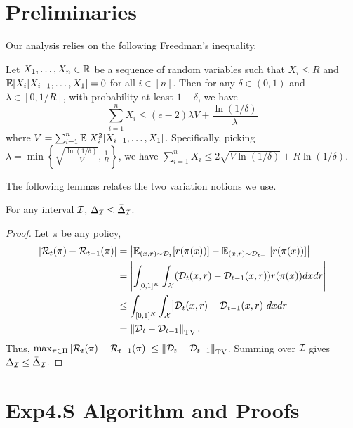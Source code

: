 \section{Preliminaries}\label{app:Freedman}

Our analysis relies on the following Freedman's inequality.
\begin{lemma}
\label{lem:freedman}
Let $X_1, \ldots, X_n \in \mathbb{R}$ be a sequence of random variables such that 
$X_i \leq R$ and $\mathbb{E}[X_i | X_{i-1}, \ldots, X_1] = 0$ for all $i \in [n]$.
Then for any $\delta \in (0,1)$ and $\lambda \in [0, 1/R]$, with probability at least $1-\delta$, we have
\[
\sum_{i=1}^n X_i \leq (e-2)\lambda V + \frac{\ln(1/\delta)}{\lambda}
\]
where $V = \sum_{i=1}^n \mathbb{E}[X_i^2 | X_{i-1}, \ldots, X_1]$.
Specifically, picking $\lambda = \min\left\{\sqrt{\frac{\ln(1/\delta)}{V}}, \frac{1}{R}\right\}$,
we have $\sum_{i=1}^n X_i  \leq 2\sqrt{V\ln(1/\delta)} + R\ln(1/\delta)$.
\end{lemma}


The following lemmas relates the two variation notions we use.
\begin{lemma}
\label{lemma:variation_relation}
  For any interval ${\mathcal{I}}$, $\Delta_{\mathcal{I}} \leq \bar{\Delta}_{\mathcal{I}}$. 
\end{lemma}

\begin{proof}
  Let $\pi$ be any policy, 
  \begin{align*} 
    |\calR_t(\pi) - \calR_{t-1}(\pi)| 
    & = \bigabs{ \E_{(x,r)\sim \calD_t}[r(\pi(x))] - \E_{(x,r)\sim \calD_{t-1}}[r(\pi(x))] }\\
    & = \left| \int_{[0,1]^K}\int_{\calX} (\calD_{t}(x,r)-\calD_{t-1}(x,r)) r(\pi(x))dxdr \right| \\
    & \leq \int_{[0,1]^K}\int_{\calX} \bigabs{\calD_{t}(x,r)-\calD_{t-1}(x,r)} dxdr \\
    & = \TVD{\calD_{t}-\calD_{t-1}}. 
  \end{align*}
  Thus, $\max_{\pi\in\Pi}|{\mathcal{R}}_t(\pi) - {\mathcal{R}}_{t-1}(\pi)| \leq \left\|{{\mathcal{D}}_{t}-{\mathcal{D}}_{t-1}}\right\|_\text{TV}$. Summing over ${\mathcal{I}}$ gives $\Delta_{\mathcal{I}}\leq \bar{\Delta}_{\mathcal{I}}$. 
\end{proof}


\section{Exp4.S Algorithm and Proofs}\label{app:Exp4.S}

